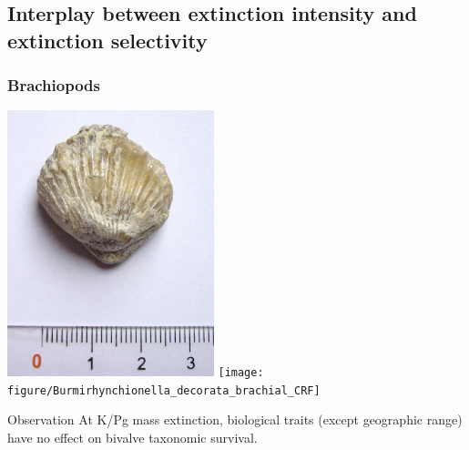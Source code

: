 \documentclass{beamer}
\begin{document}
\subsection{Interplay between extinction intensity and extinction selectivity}

\begin{frame}
  \frametitle{Brachiopods}
  \includegraphics[width = 0.45\textwidth,height = 0.8\textheight,keepaspectratio = true]{figure/Brachiopod_fossil}
  \texttt{[image: figure/Burmirhynchionella\_decorata\_brachial\_CRF]}

  \footnotesize{}
\end{frame}


\begin{frame}
  \begin{alertblock}{Observation}
    At K/Pg mass extinction, biological traits (except geographic range) have no effect on \alert{bivalve} taxonomic survival.
  \end{alertblock}

\end{frame}
\end{document}
